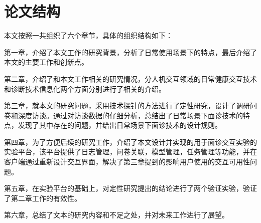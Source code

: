 \section{论文结构}
本文按照一共组织了六个章节，具体的组织结构如下：

第一章，介绍了本文工作的研究背景，分析了日常使用场景下的特点，最后介绍了本文的主要工作和创新点。

第二章，介绍了和本文工作相关的研究情况，分人机交互领域的日常健康交互技术和诊断技术信息化两个方面分别进行了相关的介绍。

第三章，就本文的研究问题，采用技术探针的方法进行了定性研究，设计了调研问卷和深度访谈。通过对访谈数据的仔细分析，总结出了日常场景下面诊技术的特点，发现了其中存在的问题，并给出日常场景下面诊技术的设计规则。

第四章，为了方便后续的研究工作，介绍了本文设计并实现的用于面诊交互实验的实验平台，该平台提供了日志管理，问卷关联，模型管理，任务管理等功能，并在客户端通过重新设计交互界面，解决了第三章提到的影响用户使用的交互可用性问题。

第五章，在实验平台的基础上，对定性研究提出的结论进行了两个验证实验，验证了第二章工作的有效性。

第六章，总结了文本的研究内容和不足之处，并对未来工作进行了展望。